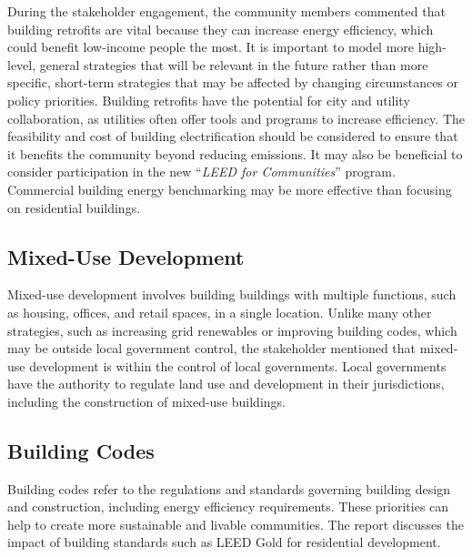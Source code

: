 \documentclass[
]{book}
\begin{document}
During the stakeholder engagement, the community members commented that building retrofits are vital because they can increase energy efficiency, which could benefit low-income people the most. It is important to model more high-level, general strategies that will be relevant in the future rather than more specific, short-term strategies that may be affected by changing circumstances or policy priorities. Building retrofits have the potential for city and utility collaboration, as utilities often offer tools and programs to increase efficiency. The feasibility and cost of building electrification should be considered to ensure that it benefits the community beyond reducing emissions. It may also be beneficial to consider participation in the new ``\emph{LEED for Communities}'' program. Commercial building energy benchmarking may be more effective than focusing on residential buildings.

\hypertarget{mixed-use-development}{%
\subsection{Mixed-Use Development}\label{mixed-use-development}}

Mixed-use development involves building buildings with multiple functions, such as housing, offices, and retail spaces, in a single location. Unlike many other strategies, such as increasing grid renewables or improving building codes, which may be outside local government control, the stakeholder mentioned that mixed-use development is within the control of local governments. Local governments have the authority to regulate land use and development in their jurisdictions, including the construction of mixed-use buildings.

\hypertarget{building-codes}{%
\subsection{Building Codes}\label{building-codes}}

Building codes refer to the regulations and standards governing building design and construction, including energy efficiency requirements. These priorities can help to create more sustainable and livable communities. The report discusses the impact of building standards such as LEED Gold for residential development.

  
\end{document}
